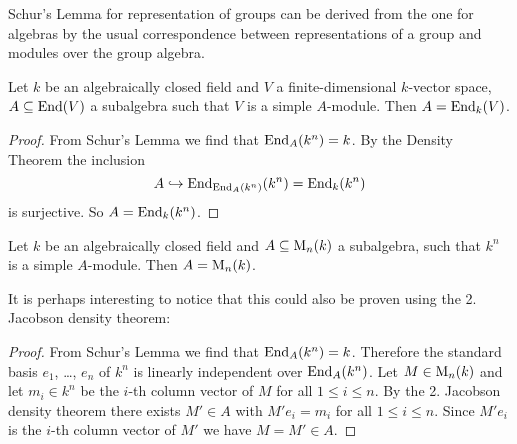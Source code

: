 \begin{rem}
 Schur’s Lemma for representation of groups can be derived from the one for algebras by the usual correspondence between representations of a group and modules over the group algebra.
\end{rem}


\begin{cor}
 Let $k$ be an algebraically closed field and $V$ a finite-dimensional $k$-vector space, $A \subseteq \operatorname{End}(V)$ a subalgebra such that $V$ is a simple $A$-module. Then $A = \operatorname{End}_k(V)$.
\end{cor}
\begin{proof}
 From Schur’s Lemma we find that $\operatorname{End}_A(k^n) = k$. By the Density Theorem the inclusion
 \[
  A \hookrightarrow \operatorname{End}_{\operatorname{End}_A(k^n)}(k^n) = \operatorname{End}_k(k^n)
 \]
 is surjective. So $A = \operatorname{End}_k(k^n)$.
\end{proof}



\begin{cor}
 Let $k$ be an algebraically closed field and $A \subseteq \operatorname{M}_n(k)$ a subalgebra, such that $k^n$ is a simple $A$-module. Then $A = \operatorname{M}_n(k)$.
\end{cor}


It is perhaps interesting to notice that this could also be proven using the 2. Jacobson density theorem:


\begin{proof}
 From Schur’s Lemma we find that $\operatorname{End}_A(k^n) = k$. Therefore the standard basis $e_1$, \dots, $e_n$ of $k^n$ is linearly independent over $\operatorname{End}_A(k^n)$. Let $M \in \operatorname{M}_n(k)$ and let $m_i \in k^n$ be the $i$-th column vector of $M$ for all $1 \leq i \leq n$. By the 2. Jacobson density theorem there exists $M' \in A$ with $M' e_i = m_i$ for all $1 \leq i \leq n$. Since $M' e_i$ is the $i$-th column vector of $M'$ we have $M = M' \in A$.
\end{proof}


